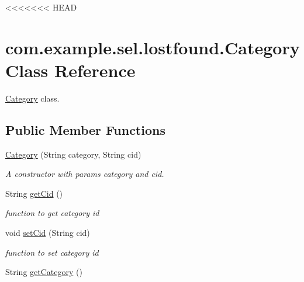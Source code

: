 <<<<<<< HEAD
\hypertarget{classcom_1_1example_1_1sel_1_1lostfound_1_1Category}{\section{com.\-example.\-sel.\-lostfound.\-Category Class Reference}
\label{classcom_1_1example_1_1sel_1_1lostfound_1_1Category}
}


\hyperlink{classcom_1_1example_1_1sel_1_1lostfound_1_1Category}{Category} class.  


\subsection*{Public Member Functions}
\begin{DoxyCompactItemize}
\item 
\hyperlink{classcom_1_1example_1_1sel_1_1lostfound_1_1Category_a01e1a68dd2639ab6bee0007cc1dcf294}{Category} (String category, String cid)
\begin{DoxyCompactList}\small\item\em A constructor with params category and cid. \end{DoxyCompactList}\item 
\hypertarget{classcom_1_1example_1_1sel_1_1lostfound_1_1Category_a9394ecafd86528fa00554aecbc76ebdb}{String \hyperlink{classcom_1_1example_1_1sel_1_1lostfound_1_1Category_a9394ecafd86528fa00554aecbc76ebdb}{get\-Cid} ()}\label{classcom_1_1example_1_1sel_1_1lostfound_1_1Category_a9394ecafd86528fa00554aecbc76ebdb}

\begin{DoxyCompactList}\small\item\em function to get category id \end{DoxyCompactList}\item 
\hypertarget{classcom_1_1example_1_1sel_1_1lostfound_1_1Category_ae020ac053079f77939440df880c105d7}{void \hyperlink{classcom_1_1example_1_1sel_1_1lostfound_1_1Category_ae020ac053079f77939440df880c105d7}{set\-Cid} (String cid)}\label{classcom_1_1example_1_1sel_1_1lostfound_1_1Category_ae020ac053079f77939440df880c105d7}

\begin{DoxyCompactList}\small\item\em function to set category id \end{DoxyCompactList}\item 
\hypertarget{classcom_1_1example_1_1sel_1_1lostfound_1_1Category_aad1c1ed95ef449791e1e27725ed60314}{String \hyperlink{classcom_1_1example_1_1sel_1_1lostfound_1_1Category_aad1c1ed95ef449791e1e27725ed60314}{get\-Category} ()}\label{classcom_1_1example_1_1sel_1_1lostfound_1_1Category_aad1c1ed95ef449791e1e27725ed60314}


\end{DoxyCompactItemize}
